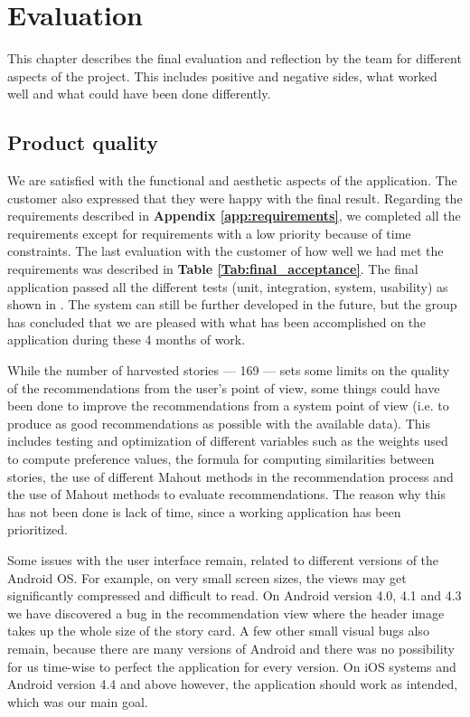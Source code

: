 
\chapter{Evaluation}

This chapter describes the final evaluation and reflection by the team for different aspects of the project. This includes positive and negative sides, what worked well and what could have been done differently.

\section{Product quality}

We are satisfied with the functional and aesthetic aspects of the application. The customer also expressed that they were happy with the final result. Regarding the requirements described in \textbf{Appendix \ref{app:requirements}}, we completed all the requirements except for requirements with a low priority because of time constraints. The last evaluation with the customer of how well we had met the requirements was described in \textbf{Table \ref{Tab:final_acceptance}}.
The final application passed all the different tests (unit, integration, system, usability) as shown in \textbf{}. The system can still be further developed in the future, but the group has concluded that we are pleased with what has been accomplished on the application during these 4 months of work.\newline

While the number of harvested stories --- 169 --- sets some limits on the quality of the recommendations from the user's point of view, some things could have been done to improve the recommendations from a system point of view (i.e. to produce as good recommendations as possible with the available data). This includes testing and optimization of different variables such as the weights used to compute preference values, the formula for computing similarities between stories, the use of different Mahout methods in the recommendation process and the use of Mahout methods to evaluate recommendations. The reason why this has not been done is lack of time, since a working application has been prioritized.\newline

Some issues with the user interface remain, related to different versions of the Android OS. For example, on very small screen sizes, the views may get significantly compressed and difficult to read. On Android version 4.0, 4.1 and 4.3 we have discovered a bug in the recommendation view where the header image takes up the whole size of the story card. A few other small visual bugs also remain, because there are many versions of Android and there was no possibility for us time-wise to perfect the application for every version. On iOS systems and Android version 4.4 and above however, the application should work as intended, which was our main goal.

